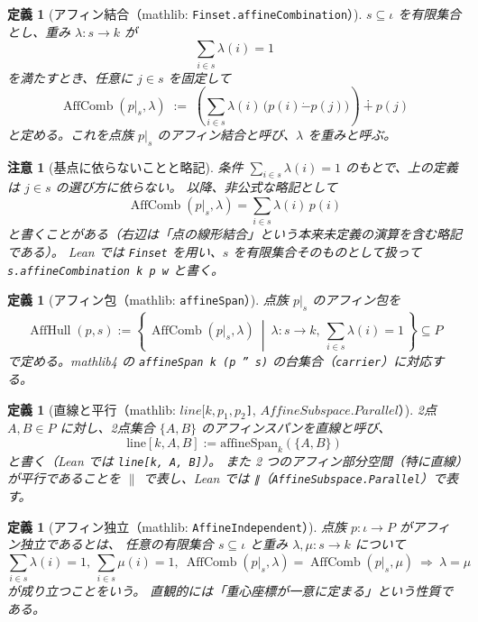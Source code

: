 \documentclass[a4paper,12pt]{bxjsbook}
\theoremstyle{theorem}
\newtheorem{definition}[theorem]{定義}
\newtheorem{remark}[theorem]{注意}
\newcommand{\dotminus}{\mathbin{\dot{-}}}
\DeclareMathOperator{\AffHull}{AffHull}
\DeclareMathOperator{\AffComb}{AffComb}
\begin{document}
    \begin{definition}[アフィン結合（mathlib: \texttt{Finset.affineCombination}）]\label{def:affcomb}
        $s\subseteq \iota$ を有限集合とし、重み $\lambda:s\to k$ が
        \[
          \sum_{i\in s}\lambda(i)=1
        \]
        を満たすとき、任意に $j\in s$ を固定して
        \[
          \AffComb(p|_s,\lambda)
          \;:=\;
          \left(\sum_{i\in s}\lambda(i)\,\bigl(p(i)\dotminus p(j)\bigr)\right)\dotplus p(j)
        \]
        と定める。これを点族 $p|_s$ の\emph{アフィン結合}と呼び、$\lambda$ を\emph{重み}と呼ぶ。
    \end{definition}

    \begin{remark}[基点に依らないことと略記]
        条件 $\sum_{i\in s}\lambda(i)=1$ のもとで、上の定義は $j\in s$ の選び方に依らない。
        以降、非公式な略記として
        \[
          \AffComb(p|_s,\lambda)=\sum_{i\in s}\lambda(i)\,p(i)
        \]
        と書くことがある（右辺は「点の線形結合」という本来未定義の演算を含む略記である）。
        Lean では \texttt{Finset} を用い、$s$ を有限集合そのものとして扱って \texttt{s.affineCombination k p w} と書く。
    \end{remark}

    \begin{definition}[アフィン包（mathlib: \texttt{affineSpan}）]
        点族 $p|_s$ の\emph{アフィン包}を
        \[
          \AffHull(p,s):=
          \left\{\,
            \AffComb(p|_s,\lambda)\ \middle|\ \lambda:s\to k,\ \sum_{i\in s}\lambda(i)=1
          \,\right\}\subseteq P
        \]
        で定める。mathlib4 の \texttt{affineSpan k (p '' s)} の台集合（\texttt{carrier}）に対応する。
    \end{definition}

    \begin{definition}[直線と平行（mathlib: \texttt{$line[k, p_1, p_2$]}, \texttt{$AffineSubspace.Parallel$}）]
        2点 $A,B\in P$ に対し、2点集合 $\{A,B\}$ のアフィンスパンを\emph{直線}と呼び、
        \[
          \mathrm{line}[k,A,B]:=\mathrm{affineSpan}_k(\{A,B\})
        \]
        と書く（Lean では \texttt{line[k, A, B]}）。
        また 2 つのアフィン部分空間（特に直線）が平行であることを $\parallel$ で表し、Lean では \texttt{∥}（\texttt{AffineSubspace.Parallel}）で表す。
    \end{definition}


    \begin{definition}[アフィン独立（mathlib: \texttt{AffineIndependent}）]
        点族 $p:\iota\to P$ が\emph{アフィン独立}であるとは、
        任意の有限集合 $s\subseteq \iota$ と重み $\lambda,\mu:s\to k$ について
        \[
          \sum_{i\in s}\lambda(i)=1,\ \sum_{i\in s}\mu(i)=1,\ 
          \AffComb(p|_s,\lambda)=\AffComb(p|_s,\mu)
          \ \Longrightarrow\ 
          \lambda=\mu
        \]
        が成り立つことをいう。
        直観的には「重心座標が一意に定まる」という性質である。
    \end{definition}
\end{document}
